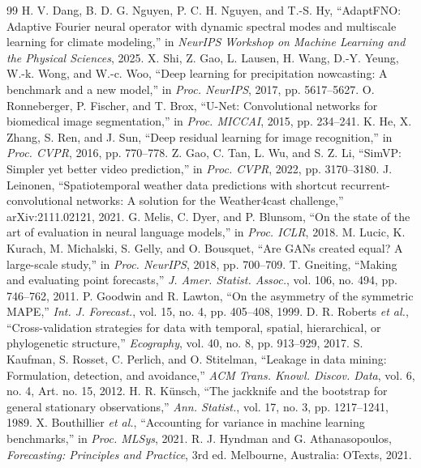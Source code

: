 \documentclass[journal]{IEEEtran}
\begin{document}
\begin{thebibliography}{99}
 H. V. Dang, B. D. G. Nguyen, P. C. H. Nguyen, and T.-S. Hy, ``AdaptFNO: Adaptive Fourier neural operator with dynamic spectral modes and multiscale learning for climate modeling,'' in \emph{NeurIPS Workshop on Machine Learning and the Physical Sciences}, 2025.
 X. Shi, Z. Gao, L. Lausen, H. Wang, D.-Y. Yeung, W.-k. Wong, and W.-c. Woo, ``Deep learning for precipitation nowcasting: A benchmark and a new model,'' in \emph{Proc. NeurIPS}, 2017, pp. 5617--5627.
 O. Ronneberger, P. Fischer, and T. Brox, ``U-Net: Convolutional networks for biomedical image segmentation,'' in \emph{Proc. MICCAI}, 2015, pp. 234--241.
 K. He, X. Zhang, S. Ren, and J. Sun, ``Deep residual learning for image recognition,'' in \emph{Proc. CVPR}, 2016, pp. 770--778.
 Z. Gao, C. Tan, L. Wu, and S. Z. Li, ``SimVP: Simpler yet better video prediction,'' in \emph{Proc. CVPR}, 2022, pp. 3170--3180.
 J. Leinonen, ``Spatiotemporal weather data predictions with shortcut recurrent-convolutional networks: A solution for the Weather4cast challenge,'' arXiv:2111.02121, 2021.
 G. Melis, C. Dyer, and P. Blunsom, ``On the state of the art of evaluation in neural language models,'' in \emph{Proc. ICLR}, 2018.
 M. Lucic, K. Kurach, M. Michalski, S. Gelly, and O. Bousquet, ``Are GANs created equal? A large-scale study,'' in \emph{Proc. NeurIPS}, 2018, pp. 700--709.
 T. Gneiting, ``Making and evaluating point forecasts,'' \emph{J. Amer. Statist. Assoc.}, vol. 106, no. 494, pp. 746--762, 2011.
 P. Goodwin and R. Lawton, ``On the asymmetry of the symmetric MAPE,'' \emph{Int. J. Forecast.}, vol. 15, no. 4, pp. 405--408, 1999.
 D. R. Roberts \emph{et al.}, ``Cross-validation strategies for data with temporal, spatial, hierarchical, or phylogenetic structure,'' \emph{Ecography}, vol. 40, no. 8, pp. 913--929, 2017.
 S. Kaufman, S. Rosset, C. Perlich, and O. Stitelman, ``Leakage in data mining: Formulation, detection, and avoidance,'' \emph{ACM Trans. Knowl. Discov. Data}, vol. 6, no. 4, Art. no. 15, 2012.
 H. R. K\"{u}nsch, ``The jackknife and the bootstrap for general stationary observations,'' \emph{Ann. Statist.}, vol. 17, no. 3, pp. 1217--1241, 1989.
 X. Bouthillier \emph{et al.}, ``Accounting for variance in machine learning benchmarks,'' in \emph{Proc. MLSys}, 2021.
 R. J. Hyndman and G. Athanasopoulos, \emph{Forecasting: Principles and Practice}, 3rd ed. Melbourne, Australia: OTexts, 2021.

\end{thebibliography}
\end{document}

